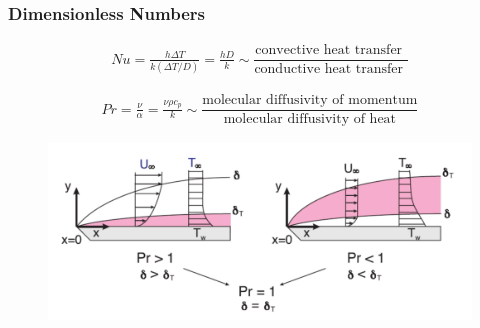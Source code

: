 \documentclass[10pt]{beamer}
\begin{document}
\begin{frame}\frametitle{Dimensionless Numbers}
\begin{align*}
Nu = \frac{ h \Delta T}{k (\Delta T/D)}  = \frac{ h D}{k } 
\sim \dfrac{\text{convective heat transfer }}{\text{conductive heat transfer }}  
\end{align*}

\begin{align*}
Pr  = \frac{\nu}{\alpha}  = \frac{\nu \rho c_p}{k}
\sim  \dfrac{\text{molecular diffusivity of momentum}}{\text{molecular diffusivity of heat}}
\end{align*}
\begin{figure}[H]
 	\centering
		\includegraphics[width=1 \textwidth]{obrazki/thermalBL.png} 
	\label{fig:thermalBL}
\end{figure}
\end{frame}
\end{document}
